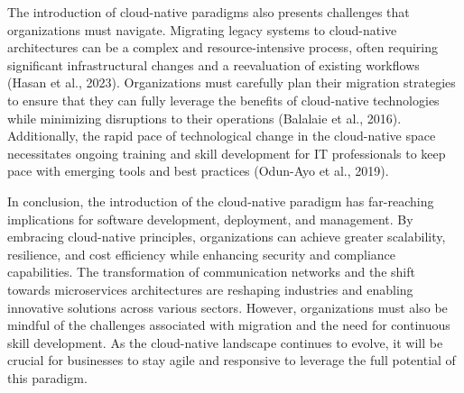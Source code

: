 The introduction of cloud-native paradigms also presents challenges that organizations must navigate. Migrating legacy systems to cloud-native architectures can be a complex and resource-intensive process, often requiring significant infrastructural changes and a reevaluation of existing workflows (Hasan et al., 2023). Organizations must carefully plan their migration strategies to ensure that they can fully leverage the benefits of cloud-native technologies while minimizing disruptions to their operations (Balalaie et al., 2016). Additionally, the rapid pace of technological change in the cloud-native space necessitates ongoing training and skill development for IT professionals to keep pace with emerging tools and best practices (Odun-Ayo et al., 2019).

In conclusion, the introduction of the cloud-native paradigm has far-reaching implications for software development, deployment, and management. By embracing cloud-native principles, organizations can achieve greater scalability, resilience, and cost efficiency while enhancing security and compliance capabilities. The transformation of communication networks and the shift towards microservices architectures are reshaping industries and enabling innovative solutions across various sectors. However, organizations must also be mindful of the challenges associated with migration and the need for continuous skill development. As the cloud-native landscape continues to evolve, it will be crucial for businesses to stay agile and responsive to leverage the full potential of this paradigm.

